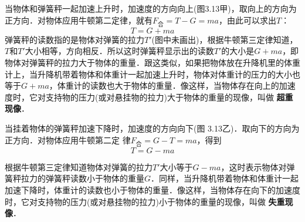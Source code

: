 \begin{Test}
\begin{figure}[H]
    \centering
    \qquad
    \vspace*{0.5cm}
    \caption{}
\end{figure}

当物体和弹簧秤一起加速上升时，加速度的方向向上(图3.13甲)，取向上的方向为正方向．对物体应用牛顿第二定律，就有$F_{\text{合}}=T-G=ma$，由此可以求出$T$：
\[ T=G+ma\]
弹簧秤的读数指的是物体对弹簧的拉力$T'$(图中未画出)，根据牛顿第三定律知道，$T$和$T'$大小相等，方向相反．所以这时弹簧秤显示出的读数$T'$的大小是$G+ma$，即物体对弹簧秤的拉力大于物体的重量．跟这类似，如果把物体放在升降机里的体重计上，当升降机带着物体和体重计一起加速上升时，物体对体重计的压力的大小也等于$G+ma$，体重计的读数也大于物体的重量．像这样，当物体存在向上的加速度时，它对支持物的压力(或对悬挂物的拉力)大于物体的重量的现像，叫做\textbf{ 超重现像}．

当挂着物体的弹簧秤加速下降时，加速度的方向向下(图
3.13乙)．取向下的方向为正方向．对物体应用牛顿第二定
律$F_{\text{合}}=G-T=ma$，得到
\[T=G-ma\]

根据牛顿第三定律知道物体对弹簧的拉力$T'$大小等于$G-ma$，这时表示物体对弹簧秤拉力的弹簧秤读数小于物体的重量$G$．同样，当升降机带着物体和体重计一起加速下降时，体重计的读数也小于物体的重量．像这样，当物体存在向下的加速度时，它对支持物的压力(或对悬挂物的拉力)小于物体的重量的现像，叫做\textbf{ 失重现像}．


\end{Test}

